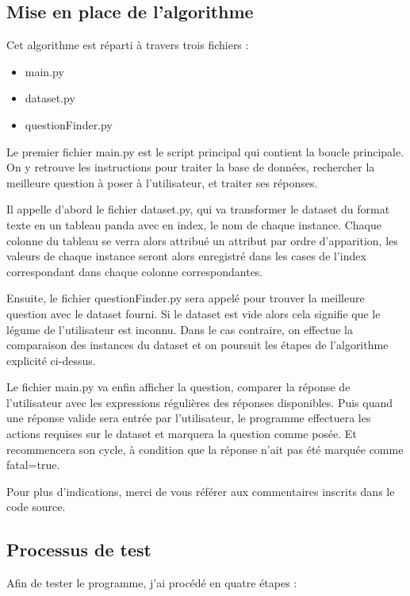 \documentclass{report}
\begin{document}
\subsection{Mise en place de l'algorithme}

Cet algorithme est réparti à travers trois fichiers :
\begin{itemize}
    \item main.py
    \item dataset.py
    \item questionFinder.py
\end{itemize}

Le premier fichier main.py est le script principal qui contient la boucle principale. On y retrouve les instructions pour traiter la base de données, rechercher la meilleure question à poser à l'utilisateur, et traiter ses réponses. 

Il appelle d'abord le fichier dataset.py, qui va transformer le dataset du format texte en un tableau panda avec en index, le nom de chaque instance. Chaque colonne du tableau se verra alors attribué un attribut par ordre d'apparition, les valeurs de chaque instance seront alors enregistré dans les cases de l'index correspondant dans chaque colonne correspondantes.

Ensuite, le fichier questionFinder.py sera appelé pour trouver la meilleure question avec le dataset fourni. Si le dataset est vide alors cela signifie que le légume de l'utilisateur est inconnu. Dans le cas contraire, on effectue la comparaison des instances du dataset et on poursuit les étapes de l'algorithme explicité ci-dessus.

Le fichier main.py va enfin afficher la question, comparer la réponse de l'utilisateur avec les expressions régulières des réponses disponibles. Puis quand une réponse valide sera entrée par l'utilisateur, le programme effectuera les actions requises sur le dataset et marquera la question comme posée. Et recommencera son cycle, à condition que la réponse n'ait pas été marquée comme fatal=true. 

Pour plus d'indications, merci de vous référer aux commentaires inscrits dans le code source.

\subsection{Processus de test}

Afin de tester le programme, j'ai procédé en quatre étapes :
\end{document}

